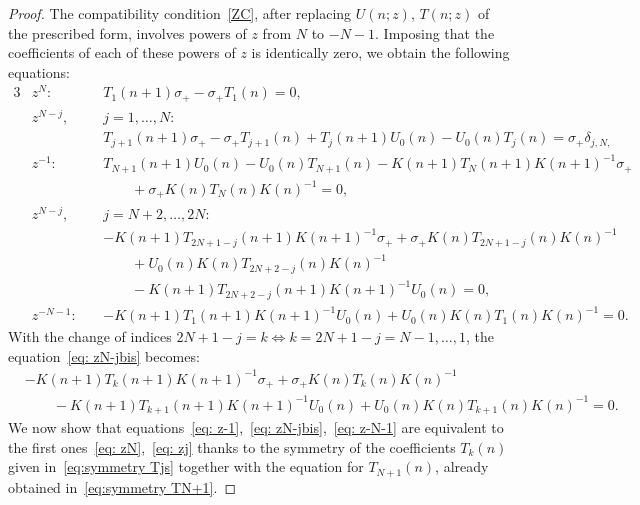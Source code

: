 \documentclass[pdftex]{sigma}%
\numberwithin{equation}{section}
\begin{document}
\begin{proof}
	 The compatibility condition~\eqref{ZC}, after replacing $U(n;z)$, $T(n;z)$ of the prescribed form, involves powers of $z$ from $N$ to $-N-1$. Imposing that the coefficients of each of these powers of $z$ is identically zero, we obtain the following equations:
\begin{alignat}{3}
\label{eq: zN}
&z^N\colon&& T_1(n+1)\sigma_+-\sigma_+T_1(n)=0,
\\[1mm]
&z^{N-j},&&\!\!\!\!\! j=1,\dots,N\colon \nonumber
\\
&&&T_{j+1}(n+1)\sigma_+-\sigma_+T_{j+1}(n)+T_{j}(n+1)U_0(n)-U_0(n)T_{j}(n)= \sigma_+\delta_{j,N,}
\label{eq: zj}
\\[1mm]
&z^{-1}\colon&& T_{N+1}(n+1)U_0(n)-U_0(n)T_{N+1}(n)-K(n+1)T_{N}(n+1)K(n+1)^{-1}\sigma_+\nonumber
\\
&&&\qquad{}+\sigma_+K(n)T_{N}(n)K(n)^{-1}=0,
\label{eq: z-1}
\\[1mm]
&z^{N-j},&&\!\!\!\!\! j=N+2,\dots,2N\colon\ \nonumber
\\
&&&-K(n+1)T_{2N+1-j}(n+1)K(n+1)^{-1}\sigma_++\sigma_+K(n)T_{2N+1-j}(n)K(n)^{-1}\nonumber
\\
&&&\qquad{}+U_0(n)K(n)T_{2N+2-j}(n)K(n)^{-1} \nonumber
\\
&&&\qquad{}-K(n+1)T_{2N+2-j}(n+1)K(n+1)^{-1}U_0(n)=0, \label{eq: zN-jbis}
\\[1mm]
&z^{-N-1}\colon\ && -K(n+1)T_{1}(n+1)K(n+1)^{-1}U_0(n)+U_0(n)K(n)T_1(n)K(n)^{-1}=0. \label{eq: z-N-1}
	\end{alignat}
	With the change of indices $2N+1-j=k \iff k=2N+1-j=N-1,\dots,1$, the equation~\eqref{eq: zN-jbis} becomes:
	\begin{align} &-K(n+1)T_k(n+1)K(n+1)^{-1}\sigma_++\sigma_+K(n)T_k(n)K(n)^{-1}\nonumber
\\
&\qquad{}-K(n+1)T_{k+1}(n+1)K(n+1)^{-1}U_0(n)+U_0(n)K(n)T_{k+1}(n)K(n)^{-1}=0. \label{eq: zN-j}
	\end{align}
	 We now show that equations~\eqref{eq: z-1},~\eqref{eq: zN-jbis},~\eqref{eq: z-N-1} are equivalent to the first ones~\eqref{eq: zN},~\eqref{eq: zj} thanks to the symmetry of the coefficients $T_k(n)$ given in~\eqref{eq:symmetry Tjs} together with the equation for $T_{N+1}(n)$, already obtained in~\eqref{eq:symmetry TN+1}.
	

\end{proof}
\end{document}

